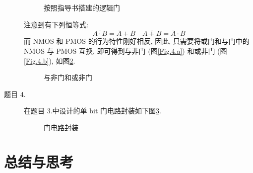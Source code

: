 \documentclass[UTF8,fontset=fandol]{ctexart}
\begin{document}
\begin{description}
\begin{figure}[H]
{        }
        \caption{按照指导书搭建的逻辑门}
        \label{Fig.3}
    \end{figure}
    注意到有下列恒等式:
    $$
    \overline{A\cdot B} = \overline{A}+\overline{B}\quad
    \overline{A+ B} = \overline{A}\cdot\overline{B}
    $$
    而 NMOS 和 PMOS 的行为特性刚好相反, 因此, 只需要将或门和与门中的 NMOS 与 PMOS 互换, 即可得到与非门 (图\ref{Fig.4.a}) 和或非门 (图\ref{Fig.4.b}), 如图\ref{Fig.4}.
    \begin{figure}[H]
        \centering
        \caption{与非门和或非门}
        \label{Fig.4}
    \end{figure}
    \item[题目 4.] 在题目 3.中设计的单 bit 门电路封装如下图\ref{Fig.5}.
    \begin{figure}[H]
        \centering
        \caption{门电路封装}
        \label{Fig.5}
    \end{figure}
\end{description}
\section*{总结与思考}
\end{document}
